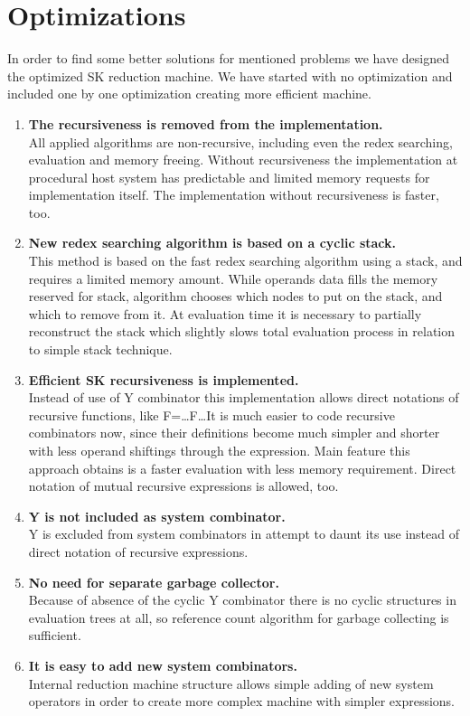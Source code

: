 \documentclass{article}
\begin{document}
\section{Optimizations}
In order to find some better solutions for mentioned problems we have
designed the optimized SK reduction machine. We have started with no
optimization and included one by one optimization creating more
efficient machine.
\begin{enumerate}
\item
{\bf The recursiveness is removed from the implementation.}\\
All applied algorithms are non-recursive, including even the redex
searching, evaluation and memory freeing. Without recursiveness the
implementation at procedural host system has predictable and limited
memory requests for implementation itself. The implementation without
recursiveness is faster, too.
\item
{\bf New redex searching algorithm is based on a cyclic stack.}\\
This method is based on the fast redex searching algorithm using a
stack, and requires a limited memory amount. While operands data
fills the memory reserved for stack, algorithm chooses which nodes
to put on the stack, and which to remove from it. At evaluation time
it is necessary to partially reconstruct the stack which slightly
slows total evaluation process in relation to simple stack technique.
\item
{\bf Efficient SK recursiveness is implemented.}\\
Instead of use of Y combinator this implementation allows direct
notations of recursive functions, like F=\ldots F\ldots It is much
easier to code recursive combinators now, since their definitions
become much simpler and shorter with less operand shiftings through
the expression. Main feature this approach obtains is a faster
evaluation with less memory requirement. Direct notation of mutual
recursive expressions is allowed, too.
\item
{\bf Y is not included as system combinator.}\\
Y is excluded from system combinators in attempt to daunt its use
instead of direct notation of recursive expressions.
\item
{\bf No need for separate garbage collector.}\\
Because of absence of the cyclic Y combinator there is no cyclic
structures in evaluation trees at all, so reference count algorithm
for garbage collecting is sufficient.
\item
{\bf It is easy to add new system combinators.}\\
Internal reduction machine structure allows simple adding of new
system operators in order to create more complex machine with simpler
expressions.
\end{enumerate}
\end{document}
